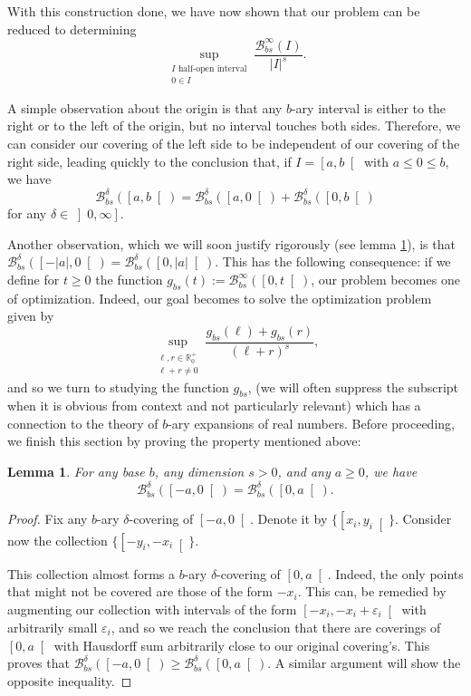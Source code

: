 \documentclass[11pt, reqno]{amsart}
\newcommand{\R}{\mathbb{R}}
\newcommand{\BB}{\mathcal{B}}
\newtheorem{lemma}{Lemma}
\begin{document}
With this construction done, we have now shown that our problem can be reduced to determining
\[\sup_{\substack{\text{$I$ half-open interval}\\ 0 \in I}} \frac{\BB_{bs}^\infty(I)}{\lvert I \rvert^s}.\]

A simple observation about the origin is that any $b$-ary interval is either to the right or to the left of the origin, but no interval touches both sides. Therefore, we can consider our covering of the left side to be independent of our covering of the right side, leading quickly to the conclusion that, if $I = \left[ a, b \right[$ with $a \leq 0 \leq b$, we have
\[\BB_{bs}^\delta(\left[a, b\right[) = \BB_{bs}^\delta(\left[a, 0\right[) + \BB_{bs}^\delta(\left[0, b\right[)\]
for any $\delta \in \left]0, \infty \right]$.

Another observation, which we will soon justify rigorously (see lemma \ref{sidedoesntmatter}), is that $\BB_{bs}^\delta(\left[-\lvert a\rvert, 0\right[) = \BB_{bs}^\delta(\left[0, \lvert a\rvert\right[)$. This has the following consequence: if we define for $t \geq 0$ the function $g_{bs}(t) := \BB_{bs}^\infty(\left[0, t \right[)$, our problem becomes one of optimization. Indeed, our goal becomes to solve the optimization problem given by
\[ \sup_{\substack{\ell,r \in \R^+_0\\\ell+r \neq 0}} \frac{g_{bs}(\ell) + g_{bs}(r)}{(\ell + r)^s}, \]
and so we turn to studying the function $g_{bs}$, (we will often suppress the subscript when it is obvious from context and not particularly relevant) which has a connection to the theory of $b$-ary expansions of real numbers. Before proceeding, we finish this section by proving the property mentioned above:

\begin{lemma} \label{sidedoesntmatter}
For any base $b$, any dimension $s > 0$, and any $a \geq 0$, we have
\[\BB_{bs}^\delta(\left[-a, 0\right[) = \BB_{bs}^\delta(\left[0, a\right[).\]
\end{lemma}

\begin{proof}
Fix any $b$-ary $\delta$-covering of $\left[-a, 0\right[$. Denote it by $\{\left[x_i, y_i\right[\}$. Consider now the collection $\{\left[-y_i, -x_i\right[\}$. 

This collection almost forms a $b$-ary $\delta$-covering of $\left[0, a\right[$. Indeed, the only points that might not be covered are those of the form $-x_i$. This can, be remedied by augmenting our collection with intervals of the form $\left[ -x_i, -x_i + \varepsilon_i \right[$ with arbitrarily small $\varepsilon_i$, and so we reach the conclusion that there are coverings of $\left[0, a\right[$ with Hausdorff sum arbitrarily close to our original covering's. This proves that $\BB_{bs}^\delta(\left[-a, 0\right[) \geq \BB_{bs}^\delta(\left[0, a\right[)$. A similar argument will show the opposite inequality.
\end{proof}
\end{document}
